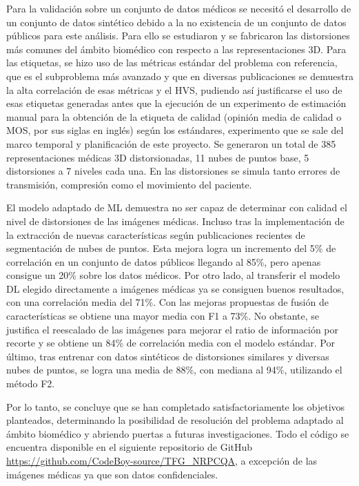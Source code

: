 Para la validación sobre un conjunto de datos médicos se necesitó el desarrollo 
de un conjunto de datos sintético debido a la no existencia de un conjunto de 
datos públicos para este análisis. Para ello se estudiaron y se fabricaron las distorsiones más 
comunes del ámbito biomédico con respecto a las representaciones 3D. Para las etiquetas, 
se hizo uso de las métricas estándar del problema con referencia, que es el subproblema 
más avanzado y que en diversas publicaciones se demuestra la alta correlación 
de esas métricas y el HVS, pudiendo así justificarse el uso de esas 
etiquetas generadas antes que la ejecución de un experimento de estimación 
manual para la obtención de la etiqueta de calidad (opinión media de calidad o MOS, por sus siglas en inglés)  según los estándares, experimento que se 
sale del marco temporal y planificación de este proyecto. Se generaron 
un total de 385 representaciones médicas 3D distorsionadas, 11 nubes de puntos 
base, 5 distorsiones a 7 niveles cada una. En las distorsiones se simula 
tanto errores de transmisión, compresión como el movimiento del paciente.

El modelo adaptado de ML demuestra no ser capaz de determinar con calidad 
el nivel de distorsiones de las imágenes médicas. Incluso tras la implementación 
de la extracción de nuevas características según publicaciones recientes 
de segmentación de nubes de puntos. Esta mejora logra un incremento del 5\% de correlación en un conjunto de datos públicos llegando al 85\%, pero apenas consigue un 20\% sobre los datos médicos. 
Por otro lado, al transferir el modelo DL elegido directamente a imágenes médicas ya se consiguen 
buenos resultados, con una correlación media del 71\%. Con las mejoras propuestas de 
fusión de características se obtiene una mayor media con F1 a 73\%. No obstante, 
se justifica el reescalado de las imágenes para mejorar el ratio de información 
por recorte y se obtiene un 84\% de correlación media con el modelo estándar. 
Por último, tras entrenar con datos sintéticos de distorsiones similares y 
diversas nubes de puntos, se logra una media de 88\%, con mediana al 94\%, utilizando el método F2.

Por lo tanto, se concluye que se han completado satisfactoriamente los objetivos 
planteados, determinando la posibilidad de resolución del problema adaptado 
al ámbito biomédico y abriendo puertas a futuras investigaciones. Todo el código
se encuentra disponible en el siguiente repositorio de GitHub \url{https://github.com/CodeBoy-source/TFG_NRPCQA},
a excepción de las imágenes médicas ya que son datos confidenciales.

